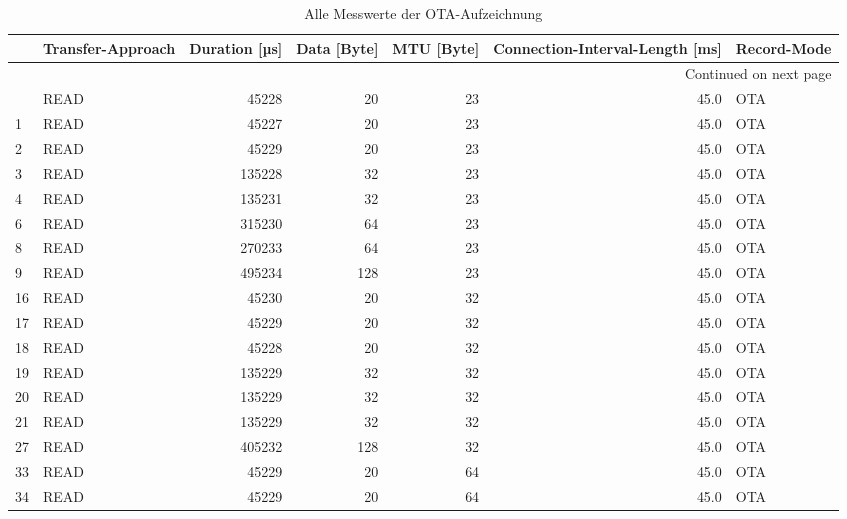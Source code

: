 \begin{longtable}{llrrrrl}
\caption{Alle Messwerte der OTA-Aufzeichnung}\label{table:otaallvalues}\\
\toprule
{} & Transfer-Approach &  Duration [µs] &  Data [Byte] &  MTU [Byte] &  Connection-Interval-Length [ms] & Record-Mode \\
\midrule
\endhead
\midrule
\multicolumn{7}{r}{{Continued on next page}} \\
\midrule
\endfoot

\bottomrule
\endlastfoot
0   &         READ &     45228 &         20 &        23 &           45.0 &  OTA \\
1   &         READ &     45227 &         20 &        23 &           45.0 &  OTA \\
2   &         READ &     45229 &         20 &        23 &           45.0 &  OTA \\
3   &         READ &    135228 &         32 &        23 &           45.0 &  OTA \\
4   &         READ &    135231 &         32 &        23 &           45.0 &  OTA \\
6   &         READ &    315230 &         64 &        23 &           45.0 &  OTA \\
8   &         READ &    270233 &         64 &        23 &           45.0 &  OTA \\
9   &         READ &    495234 &        128 &        23 &           45.0 &  OTA \\
16  &         READ &     45230 &         20 &        32 &           45.0 &  OTA \\
17  &         READ &     45229 &         20 &        32 &           45.0 &  OTA \\
18  &         READ &     45228 &         20 &        32 &           45.0 &  OTA \\
19  &         READ &    135229 &         32 &        32 &           45.0 &  OTA \\
20  &         READ &    135229 &         32 &        32 &           45.0 &  OTA \\
21  &         READ &    135229 &         32 &        32 &           45.0 &  OTA \\
27  &         READ &    405232 &        128 &        32 &           45.0 &  OTA \\
33  &         READ &     45229 &         20 &        64 &           45.0 &  OTA \\
34  &         READ &     45229 &         20 &        64 &           45.0 &  OTA \\

\end{longtable}
